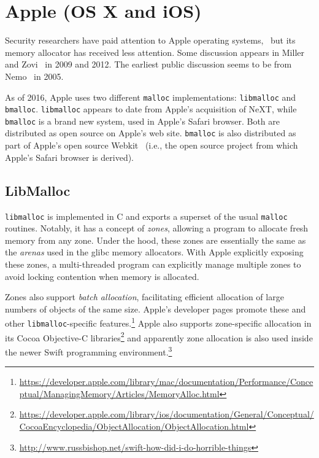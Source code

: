 \section{Apple (OS X and iOS)}
Security researchers have paid attention to
Apple operating systems,~\cite{reverse}
but its memory allocator has received less attention.
Some discussion appears in Miller and
Zovi~\cite{mac-hackers-handbook-2009,ios-hackers-handbook-2012}
in 2009 and 2012.  The earliest public discussion seems to be from
Nemo~\cite{nemo2005} in 2005.

As of 2016, Apple uses two different \texttt{malloc} implementations:
\texttt{libmalloc} and \texttt{bmalloc}. \texttt{libmalloc} appears to date
from Apple's acquisition of NeXT, while \texttt{bmalloc} is a brand new
system, used in Apple's Safari browser. Both are distributed as open
source on Apple's web site\cite{libmalloc, bmalloc}. \texttt{bmalloc} is also distributed
as part of Apple's open source Webkit~\cite{webkit} (i.e., the open
source project from which Apple's Safari browser is derived).


\subsection{LibMalloc}
\label{sec:libmalloc}

\texttt{libmalloc} is implemented in C and exports a superset of the
usual \texttt{malloc} routines. Notably, it has a concept of {\em zones},
allowing a program to allocate fresh memory from any zone. Under the
hood, these zones are essentially the same as the {\em arenas} used in
the glibc memory allocators. With Apple
explicitly exposing these zones, a multi-threaded program can
explicitly manage multiple zones to avoid locking contention when
memory is allocated.

Zones also support {\em batch allocation}, facilitating
efficient  allocation of large numbers of objects of the same size.
Apple's developer pages promote these and other \texttt{libmalloc}-specific
features.\footnote{\url{https://developer.apple.com/library/mac/documentation/Performance/Conceptual/ManagingMemory/Articles/MemoryAlloc.html}}
Apple
also supports zone-specific allocation in its Cocoa Objective-C
libraries\footnote{\url{https://developer.apple.com/library/ios/documentation/General/Conceptual/CocoaEncyclopedia/ObjectAllocation/ObjectAllocation.html}}
and apparently zone allocation is also used inside the newer Swift
programming
environment.\footnote{\url{http://www.russbishop.net/swift-how-did-i-do-horrible-things}}

